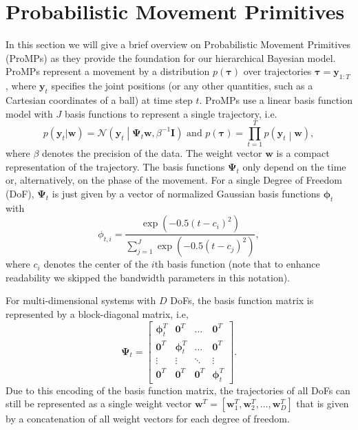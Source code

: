 \documentclass[letterpaper, 10 pt, conference]{ieeeconf}  %
\newcommand{\N}{\ensuremath{\mathcal{N}}}
\renewcommand{\vec}[1]{\ensuremath{\boldsymbol{#1}}}
\begin{document}
\section{Probabilistic Movement Primitives}

In this section we will give a brief overview on Probabilistic Movement Primitives (ProMPs) as they provide the foundation for our hierarchical Bayesian model. 
ProMPs represent a movement by a distribution $p(\vec \tau)$ over trajectories $\vec \tau = \vec y_{1:T}$, where $\vec y_t$ specifies the joint positions (or any other quantities, 
such as a Cartesian coordinates of a ball) at time step $t$. ProMPs use a linear basis function model with $J$ basis functions to represent a single trajectory, i.e.
$$ p(\vec y_t|\vec w) = \N \left (\vec y_t \middle |\vec \Psi_t \vec w,
\beta^{-1} \vec I \right ) \textrm{ and } p(\vec \tau) = \prod_{t=1}^T
p\left(\vec y_t\middle |\vec w\right),$$
where $\beta$ denotes the precision of the data. 
The weight vector $\vec w$  is a compact representation of the trajectory. 
The basis functions $\vec \Psi_t$ only depend on the time or, alternatively, 
on the phase of the movement. For a single Degree of Freedom (DoF), $\vec \Psi_t$ is just given by a vector of normalized Gaussian basis functions $\vec \phi_t$ with 
$$ \phi_{t,i} = \frac{\exp\left(-0.5 (t - c_i)^2 \right)}{\sum_{j = 1}^J \exp\left(-0.5 (t - c_j)^2\right)},$$
where $c_i$ denotes the center of the $i$th basis function (note that to enhance readability we skipped the bandwidth parameters in this notation).

For multi-dimensional systems with $D$ DoFs, the basis function matrix
is represented by a block-diagonal matrix, i.e, 
$$\vec \Psi_t = \left[\begin{array}{cccc} \vec \phi_t^T & \vec 0^T & \dots & \vec 0^T \\ \vec 0^T & \vec \phi_t^T &  \dots & \vec 0^T \\ \vdots & \vdots & \ddots & \vdots \\ \vec 0^T & \vec 0^T & \vec 0^T & \vec \phi_t^T  \end{array}\right].$$
Due to this encoding of the basis function matrix, the trajectories of all DoFs can still be represented as 
a single weight vector $\vec w^T = [\vec w_1^T, \vec w_2^T, \dots, \vec w_D^T]$ that is given by a concatenation of all 
weight vectors for each degree of freedom.
\end{document}
